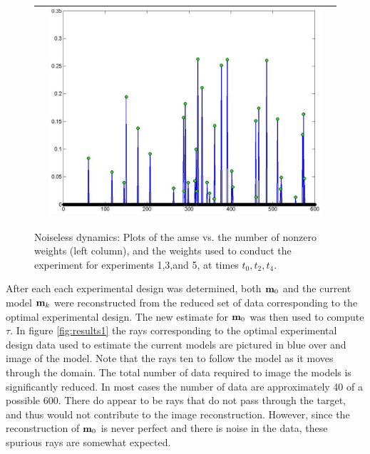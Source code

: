 \documentclass[english]{siamltex}
\newcommand{\bfm}	{{\bf{m}}}
\begin{document}
{\begin{figure}[!h]
\begin{center}
\begin{tabular}{|c|c|c|}
			&
			\includegraphics[width=.8\iwidth]{figures/newFigs/exp5Weights}\\			
			\hline
		\end{tabular}
	\end{center}
	\caption{Noiseless dynamics: Plots of the {\sf amse} vs. the number of nonzero weights (left column), and the weights used to conduct the experiment for experiments 1,3,and 5, at times $t_0,t_2,t_4$.}
	\label{fig:weights1}
\end{figure}

After each each experimental design was determined, both $\bfm_0$ and the current model $\bfm_k$ were reconstructed from the reduced set of data corresponding to the optimal experimental design. The new estimate for $\bfm_0$ was then used to compute $\tau$. In figure \ref{fig:results1} the rays corresponding to the optimal experimental design data used to estimate the current models are pictured in blue over and image of the model. Note that the rays ten to follow the model as it moves through the domain. The total number of data required to image the models is significantly reduced. In most cases the number of data are approximately 40 of a possible 600. There do appear to be rays that do not pass through the target, and thus would not contribute to the image reconstruction. However, since the reconstruction of $\bfm_0$ is never perfect and there is noise in the data, these spurious rays are somewhat expected. 

}
\end{document}
